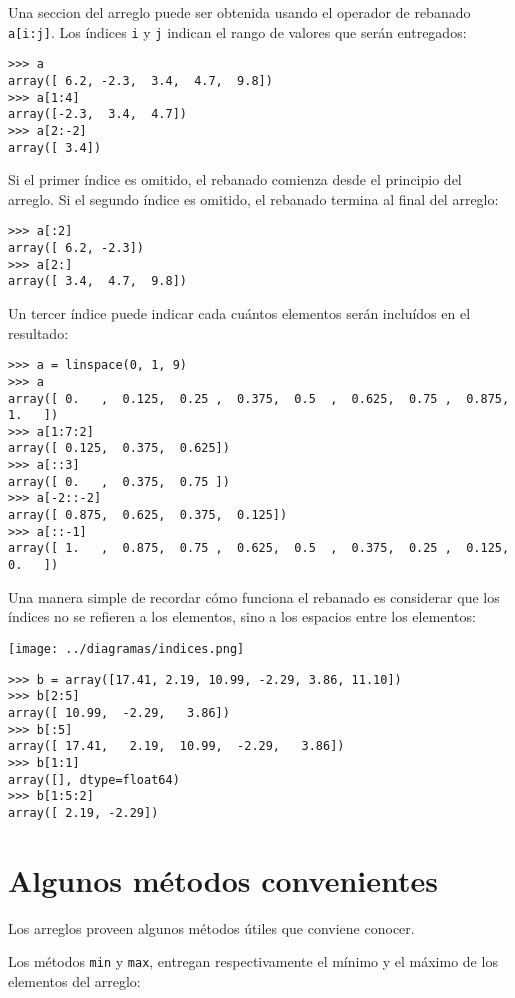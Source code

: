 Una seccion del arreglo puede ser obtenida usando el operador de
rebanado \lstinline!a[i:j]!. Los índices \lstinline!i! y \lstinline!j!
indican el rango de valores que serán entregados:

\begin{lstlisting}
>>> a
array([ 6.2, -2.3,  3.4,  4.7,  9.8])
>>> a[1:4]
array([-2.3,  3.4,  4.7])
>>> a[2:-2]
array([ 3.4])
\end{lstlisting}

Si el primer índice es omitido, el rebanado comienza desde el principio
del arreglo. Si el segundo índice es omitido, el rebanado termina al
final del arreglo:

\begin{lstlisting}
>>> a[:2]
array([ 6.2, -2.3])
>>> a[2:]
array([ 3.4,  4.7,  9.8])
\end{lstlisting}

Un tercer índice puede indicar cada cuántos elementos serán incluídos en
el resultado:

\begin{lstlisting}
>>> a = linspace(0, 1, 9)
>>> a
array([ 0.   ,  0.125,  0.25 ,  0.375,  0.5  ,  0.625,  0.75 ,  0.875,  1.   ])
>>> a[1:7:2]
array([ 0.125,  0.375,  0.625])
>>> a[::3]
array([ 0.   ,  0.375,  0.75 ])
>>> a[-2::-2]
array([ 0.875,  0.625,  0.375,  0.125])
>>> a[::-1]
array([ 1.   ,  0.875,  0.75 ,  0.625,  0.5  ,  0.375,  0.25 ,  0.125,  0.   ])
\end{lstlisting}

Una manera simple de recordar cómo funciona el rebanado es considerar
que los índices no se refieren a los elementos, sino a los espacios
entre los elementos:

\texttt{[image: ../diagramas/indices.png]}

\begin{lstlisting}
>>> b = array([17.41, 2.19, 10.99, -2.29, 3.86, 11.10])
>>> b[2:5]
array([ 10.99,  -2.29,   3.86])
>>> b[:5]
array([ 17.41,   2.19,  10.99,  -2.29,   3.86])
>>> b[1:1]
array([], dtype=float64)
>>> b[1:5:2]
array([ 2.19, -2.29])
\end{lstlisting}

\section{Algunos métodos convenientes}

Los arreglos proveen algunos métodos útiles que conviene conocer.

Los métodos \lstinline!min! y \lstinline!max!, entregan respectivamente
el mínimo y el máximo de los elementos del arreglo:

